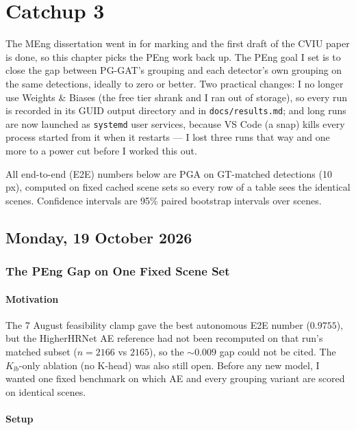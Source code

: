 \chapter[Catchup 3]{Catchup 3}

The MEng dissertation went in for marking and the first draft of the CVIU paper is done, so this chapter picks the PEng work back up.
The PEng goal I set is to close the gap between PG-GAT's grouping and each detector's own grouping on the same detections, ideally to zero or better.
Two practical changes: I no longer use Weights \& Biases (the free tier shrank and I ran out of storage), so every run is recorded in its GUID output directory and in \texttt{docs/results.md}; and long runs are now launched as \texttt{systemd} user services, because VS Code (a snap) kills every process started from it when it restarts --- I lost three runs that way and one more to a power cut before I worked this out.

All end-to-end (E2E) numbers below are PGA on GT-matched detections (10 px), computed on fixed cached scene sets so every row of a table sees the identical scenes.
Confidence intervals are 95\% paired bootstrap intervals over scenes.

\section[2026/10/19]{Monday, 19 October 2026}

\subsection{The PEng Gap on One Fixed Scene Set}

\subsubsection{Motivation}

The 7 August feasibility clamp gave the best autonomous E2E number ($0.9755$), but the HigherHRNet AE reference had not been recomputed on that run's matched subset ($n\!=\!2166$ vs $2165$), so the $\sim\!0.009$ gap could not be cited.
The $K_{lb}$-only ablation (no K-head) was also still open.
Before any new model, I wanted one fixed benchmark on which AE and every grouping variant are scored on identical scenes.

\subsubsection{Setup}

